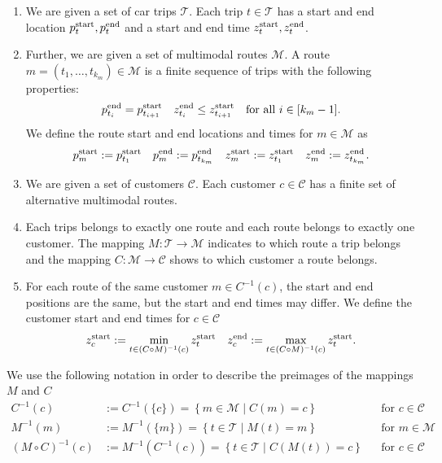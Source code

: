\begin{definition}
\label{def:trips_routes_customers}

\begin{enumerate}
	\item
We are given a set of car trips $\mathcal{T}$. Each trip $t\in\mathcal{T}$ has a start and end location $p^{\operatorname{start}}_t, p^{\operatorname{end}}_t$ and a start and end time $z^{\operatorname{start}}_t, z^{\operatorname{end}}_t$.

	\item
Further, we are given a set of multimodal routes $\mathcal{M}$. A route ${m=\left(t_1,\dots,t_{k_m}\right)\in\mathcal{M}}$ is a finite sequence of trips with the following properties:
\begin{align*}
	p^{\operatorname{end}}_{t_i} = p^{\operatorname{start}}_{t_{i+1}} && z^{\operatorname{end}}_{t_i} \leq z^{\operatorname{start}}_{t_{i+1}} && \text{for all } i\in[k_m-1].
\end{align*}	
We define the route start and end locations and times for $m\in\mathcal{M}$ as
\begin{align*}
	p^{\operatorname{start}}_m := p^{\operatorname{start}}_{t_1} & &  p^{\operatorname{end}}_m := p^{\operatorname{end}}_{t_{k_m}} & & z^{\operatorname{start}}_m := z^{\operatorname{start}}_{t_1} & & z^{\operatorname{end}}_m := z^{\operatorname{end}}_{t_{k_m}}.
\end{align*}

	\item
We are given a set of customers $\mathcal{C}$. Each customer $c\in\mathcal{C}$ has a finite set of alternative multimodal routes.

	\item
Each trips belongs to exactly one route and each route belongs to exactly one customer. The mapping $M:\mathcal{T}\to\mathcal{M}$ indicates to which route a trip belongs and the mapping $C:\mathcal{M}\to\mathcal{C}$ shows to which customer a route belongs.	

	\item
For each route of the same customer $m\in C^{-1}(c)$, the start and end positions are the same, but the start and end times may differ. We define the customer start and end times for $c\in\mathcal{C}$
\begin{align*}
	z^{\operatorname{start}}_c := \min_{t\in (C\circ M)^{-1}(c)}z^{\operatorname{start}}_t & & z^{\operatorname{end}}_c := \max_{t\in (C\circ M)^{-1}(c)}z^{\operatorname{start}}_t .
\end{align*}
\end{enumerate}

\end{definition}

We use the following notation in order to describe the preimages of the mappings $M$ and $C$
\begin{align*}
	C^{-1}(c) & := C^{-1}\left(\{c\}\right) = \left\{m\in\mathcal{M}\mid C(m)=c\right\} && \text{for } c\in\mathcal{C} \\
	M^{-1}(m) & := M^{-1}\left(\{m\}\right) = \left\{t\in\mathcal{T}\mid M(t)=m\right\} && \text{for } m\in\mathcal{M} \\
	\left(M\circ C\right)^{-1}(c) & := M^{-1}\left(C^{-1}(c)\right) = \left\{t\in\mathcal{T}\mid C\left(M(t)\right)=c\right\} && \text{for } c\in\mathcal{C}
\end{align*}

